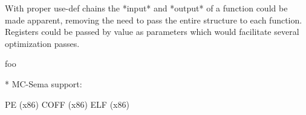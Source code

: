 With proper use-def chains the *input* and *output* of a function could be made apparent, removing the need to pass the entire structure to each function. Registers could be passed by value as parameters which would facilitate several optimization passes.





foo \cite{mcsema}

* MC-Sema support:

PE (x86)
COFF (x86)
ELF (x86)
